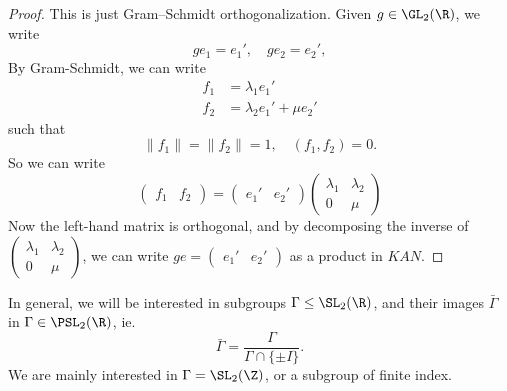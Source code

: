 \documentclass[a4paper]{article}
\begin{document}
\begin{proof}
  This is just Gram--Schmidt orthogonalization. Given $g \in \GL_2(\R)$, we write
  \[
    g e_1 = e_1',\quad g e_2 = e_2',
  \]
  By Gram-Schmidt, we can write
  \begin{align*}
    f_1 &= \lambda_1 e_1'\\
    f_2 &= \lambda_2 e_1' + \mu e_2'
  \end{align*}
  such that
  \[
    \|f_1\| = \|f_2\| = 1,\quad (f_1, f_2) = 0.
  \]
  So we can write
  \[
    \begin{pmatrix}
      f_1 & f_2
    \end{pmatrix} =
    \begin{pmatrix}
      e_1' & e_2'
    \end{pmatrix}
    \begin{pmatrix}
      \lambda_1 & \lambda_2\\
      0 & \mu
    \end{pmatrix}
  \]
  Now the left-hand matrix is orthogonal, and by decomposing the inverse of $\begin{pmatrix} \lambda_1 & \lambda_2\\0 & \mu\end{pmatrix}$, we can write $ge = \begin{pmatrix}e_1' & e_2'\end{pmatrix}$ as a product in $KAN$.
\end{proof}
In general, we will be interested in subgroups $\Gamma \leq\SL_2(\R)$, and their images $\bar\Gamma$ in $\Gamma \in \PSL_2(\R)$, ie.
\[
  \bar\Gamma = \frac{\Gamma}{\Gamma \cap \{\pm I\}}.
\]
We are mainly interested in $\Gamma = \SL_2(\Z)$, or a subgroup of finite index.
\end{document}
